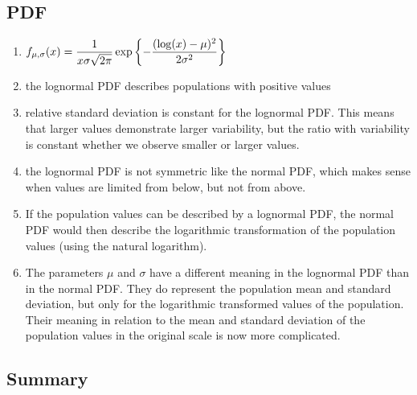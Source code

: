 \subsection{PDF}

\begin{enumerate}
    \item[] $
        f_{\mu, \sigma}(x) = \dfrac{1}{x\sigma \sqrt{2\pi}} \exp\left\{
            -\dfrac{(\log(x) - \mu)^2}{2\sigma^2}
        \right\}
    $
    \hfill \cite{statistics/book/Statistics-for-Data-Scientists/Maurits-Kaptein}
    
    \item the lognormal PDF describes populations with positive values
    \hfill \cite{statistics/book/Statistics-for-Data-Scientists/Maurits-Kaptein}

    \item relative standard deviation  is constant for the lognormal PDF. 
    This means that larger values demonstrate larger variability, but the ratio with variability is constant whether we observe smaller or larger values. 
    \hfill \cite{statistics/book/Statistics-for-Data-Scientists/Maurits-Kaptein}

    \item the lognormal PDF is not symmetric like the normal PDF, which makes sense when values are limited from below, but not from above.
    \hfill \cite{statistics/book/Statistics-for-Data-Scientists/Maurits-Kaptein}

    \item  If the population values can be described by a lognormal PDF, the normal PDF would then describe the logarithmic transformation of the population values (using the natural logarithm).
    \hfill \cite{statistics/book/Statistics-for-Data-Scientists/Maurits-Kaptein}

    \item The parameters $\mu$ and $\sigma$ have a different meaning in the lognormal PDF than in the normal PDF. 
    They do represent the population mean and standard deviation, but only for the logarithmic transformed values of the population. 
    Their meaning in relation to the mean and standard deviation of the population values in the original scale is now more complicated. 
    \hfill \cite{statistics/book/Statistics-for-Data-Scientists/Maurits-Kaptein}
\end{enumerate}



\subsection{Summary}

